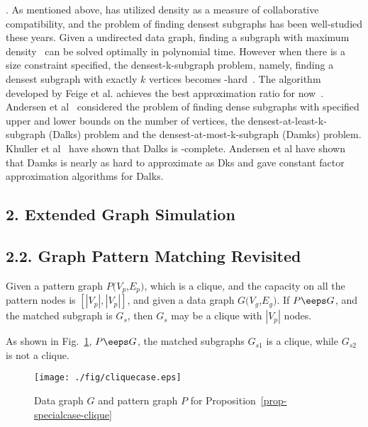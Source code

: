 .
As mentioned above, \cite{GajewarS12} has utilized density as a measure of collaborative compatibility, and the problem of finding densest subgraphs has been well-studied these years. Given a undirected data graph, finding a subgraph with maximum density~\cite{Goldberg84} can be solved optimally in polynomial time. However when there is a size constraint specified, the densest-k-subgraph problem, namely, finding a densest subgraph with exactly $k$ vertices becomes \NP-hard~\cite{FeigeML01,FeigePK01}. The algorithm developed by Feige et al. achieves the best approximation ratio for now~\cite{FeigePK01}. Andersen et al~\cite{Andersen09} considered the problem of finding dense subgraphs with specified upper and lower bounds on the number of vertices, the densest-at-least-k-subgraph (Dalks) problem and the densest-at-most-k-subgraph (Damks) problem. Khuller et al~\cite{Khuller09} have shown that Dalks is \NP-complete. Andersen et al have shown that Damks is nearly as hard to approximate as Dks and gave constant factor approximation algorithms for Dalks.


\subsection*{2. Extended Graph Simulation}

\subsection*{2.2. Graph Pattern Matching Revisited}
\begin{prop}
\label{prop-specialcase-clique}
Given a pattern graph $P(V_p$,$E_p)$, which is a clique, and the capacity on all the pattern nodes is $[|V_p|, |V_p|]$, and given a data graph $G(V_g$,$E_g)$. If $P \eeps G$, and the matched subgraph is $G_s$, then $G_s$ may be a clique with $|V_p|$ nodes.
\end{prop}

As shown in Fig.~\ref{fig-cliquecase}, $P \eeps G$, the matched subgraphs $G_{s1}$ is a clique, while $G_{s2}$ is not a clique.

\begin{figure}[tb!]
\begin{center}
\texttt{[image: ./fig/cliquecase.eps]}
\caption{Data graph $G$ and pattern graph $P$ for Proposition~\ref{prop-specialcase-clique}}
\label{fig-cliquecase}
\end{center}
\end{figure}

